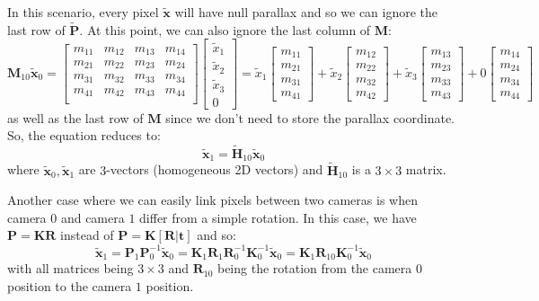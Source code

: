 In this scenario, every pixel $\tilde{\mathbf{x}}$ will have null parallax and so we can ignore the last row of $\tilde{\mathbf{{P}}}$. At this point, we can also ignore the last column of $\mathbf{M}$:
$$\mathbf{M}_{10}\tilde{\mathbf{x}}_{0}=
\begin{bmatrix}
m_{11} & m_{12} & m_{13} & m_{14} \\
m_{21} & m_{22} & m_{23} & m_{24} \\
m_{31} & m_{32} & m_{33} & m_{34} \\
m_{41} & m_{42} & m_{43} & m_{44} \\
\end{bmatrix}
\begin{bmatrix}
\tilde{x}_{1} \\
\tilde{x}_{2} \\
\tilde{x}_{3} \\
0
\end{bmatrix}=
\tilde{x}_{1}\begin{bmatrix}
m_{11} \\
m_{21} \\
m_{31} \\
m_{41}
\end{bmatrix}
+
\tilde{x}_{2}\begin{bmatrix}
m_{12} \\
m_{22} \\
m_{32} \\
m_{42}
\end{bmatrix}
+
\tilde{x}_{3}\begin{bmatrix}
m_{13} \\
m_{23} \\
m_{33} \\
m_{43}
\end{bmatrix}
+
0\begin{bmatrix}
m_{14} \\
m_{24} \\
m_{34} \\
m_{44}
\end{bmatrix}
$$
as well as the last row of $\mathbf{M}$ since we don't need to store the parallax coordinate. So, the equation reduces to:
$$\tilde{\mathbf{x}}_{1}=\tilde{\mathbf{H}}_{10}\tilde{\mathbf{x}}_{0}$$
where $\tilde{\mathbf{x}}_{0},\tilde{\mathbf{x}}_{1}$ are $3$-vectors (homogeneous 2D vectors) and $\tilde{\mathbf{H}}_{10}$ is a $3\times 3$ matrix.

Another case where we can easily link pixels between two cameras is when camera $0$ and camera $1$ differ from a simple rotation. In this case, we have $\mathbf{P}=\mathbf{K}\mathbf{R}$ instead of $\mathbf{P}=\mathbf{K}[\mathbf{R}|\mathbf{t}]$ and so:
$$\tilde{\mathbf{x}}_{1}=\mathbf{P}_{1}\mathbf{P}^{-1}_{0}\tilde{\mathbf{x}}_{0}=\mathbf{K}_{1}\mathbf{R}_{1}\mathbf{R}^{-1}_{0}\mathbf{K}_{0}^{-1}\tilde{\mathbf{x}}_{0}=\mathbf{K}_{1}\mathbf{R}_{10}\mathbf{K}_{0}^{-1}\tilde{\mathbf{x}}_{0}$$
with all matrices being $3\times 3$ and $\mathbf{R}_{10}$ being the rotation from the camera $0$ position to the camera $1$ position.


